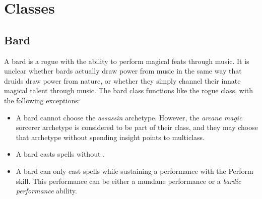 


\section{Classes}
    \subsection{Bard}
        A bard is a rogue with the ability to perform magical feats through music.
        It is unclear whether bards actually draw power from music in the same way that druids draw power from nature, or whether they simply channel their innate magical talent through music.
        The bard class functions like the rogue class, with the following exceptions:
        \begin{itemize}
            \item A bard cannot choose the \textit{assassin} archetype. However, the \textit{arcane magic} sorcerer archetype is considered to be part of their class, and they may choose that archetype without spending insight points to multiclass.
            \item A bard casts spells without .
            \item A bard can only cast spells while sustaining a performance with the Perform skill. This performance can be either a mundane performance or a \textit{bardic performance} ability.
        \end{itemize}

